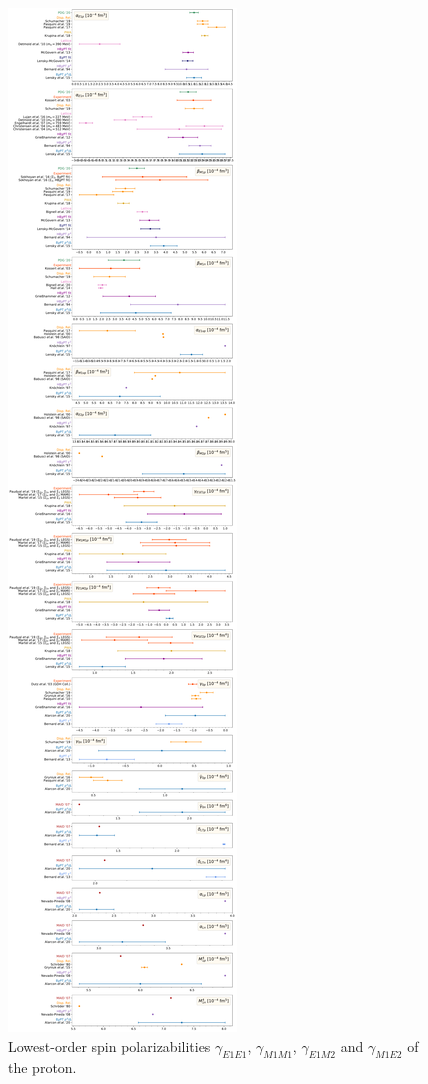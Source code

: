 \documentclass[preprints,review,accept,moreauthors,pdftex]{Definitions/mdpi}
\def\ga{\gamma} \def\Ga{{\it\Gamma}}
\begin{document}
\begin{figure}[t]
\centering
\includegraphics[width=\columnwidth]{Figures/ForwardSpinPolarizabilities.pdf}
\caption{Lowest-order spin polarizabilities $\ga_{E1E1}$, $\ga_{M1M1}$, $\ga_{E1M2}$ and $\ga_{M1E2}$ of the proton. \label{ForwardSpinPolarizabilities}}
\end{figure} 
\end{document}
